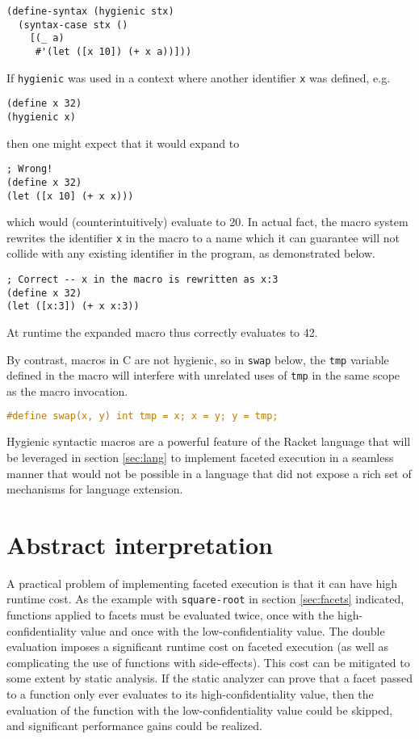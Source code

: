 \documentclass{article}
\begin{document}
\begin{lstlisting}
(define-syntax (hygienic stx)
  (syntax-case stx ()
    [(_ a)
     #'(let ([x 10]) (+ x a))]))
\end{lstlisting}

If \texttt{hygienic} was used in a context where another identifier \texttt{x} was defined, e.g.

\begin{lstlisting}
(define x 32)
(hygienic x)
\end{lstlisting}

then one might expect that it would expand to

\begin{lstlisting}
; Wrong!
(define x 32)
(let ([x 10] (+ x x)))
\end{lstlisting}

which would (counterintuitively) evaluate to 20. In actual fact, the macro system rewrites the identifier \texttt{x} in the macro to a name which it can guarantee will not collide with any existing identifier in the program, as demonstrated below.

\begin{lstlisting}
; Correct -- x in the macro is rewritten as x:3
(define x 32)
(let ([x:3]) (+ x x:3))
\end{lstlisting}

At runtime the expanded macro thus correctly evaluates to 42.

By contrast, macros in C are not hygienic, so in \texttt{swap} below, the \texttt{tmp} variable defined in the macro will interfere with unrelated uses of \texttt{tmp} in the same scope as the macro invocation.

\begin{lstlisting}[language=C]
#define swap(x, y) int tmp = x; x = y; y = tmp;
\end{lstlisting}

Hygienic syntactic macros are a powerful feature of the Racket language that will be leveraged in section \ref{sec:lang} to implement faceted execution in a seamless manner that would not be possible in a language that did not expose a rich set of mechanisms for language extension.



\section{Abstract interpretation}
A practical problem of implementing faceted execution is that it can have high runtime cost. As the example with \texttt{square-root} in section \ref{sec:facets} indicated, functions applied to facets must be evaluated twice, once with the high-confidentiality value and once with the low-confidentiality value. The double evaluation imposes a significant runtime cost on faceted execution (as well as complicating the use of functions with side-effects). This cost can be mitigated to some extent by static analysis. If the static analyzer can prove that a facet passed to a function only ever evaluates to its high-confidentiality value, then the evaluation of the function with the low-confidentiality value could be skipped, and significant performance gains could be realized.
\end{document}
